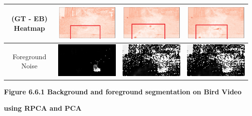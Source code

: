 \documentclass[11pt]{scrartcl} %
\theoremstyle{plain}
\begin{document}
\begin{minipage}{\linewidth}
\begin{tabular}{ | c | m{2.8cm} | m{2.8cm} | m{2.8cm} | }
	(GT - EB) Heatmap
	&
    \begin{minipage}{.3\textwidth}
      \includegraphics[width=\linewidth, width=25mm]{figures_video/crow/rpca/hm_0_015.png}
    \end{minipage}	
	&
    \begin{minipage}{.3\textwidth}
      \includegraphics[width=\linewidth, width=25mm]{figures_video/crow/pca/hm_0.png}
    \end{minipage}		
	&
    \begin{minipage}{.3\textwidth}
      \includegraphics[width=\linewidth, width=25mm]{figures_video/crow/pca2/hm_0.png}
    \end{minipage}		
	\\ \hline	
	
	Foreground Noise
	&
    \begin{minipage}{.3\textwidth}
      \includegraphics[width=\linewidth, width=25mm]{figures_video/crow/rpca/noise_0_015.png}
    \end{minipage}
	&
    \begin{minipage}{.3\textwidth}
      \includegraphics[width=\linewidth, width=25mm]{figures_video/crow/pca/noise_0.png}
    \end{minipage}
	&
    \begin{minipage}{.3\textwidth}
      \includegraphics[width=\linewidth, width=25mm]{figures_video/crow/pca2/noise_0.png}
    \end{minipage}
	\\ \hline	
	
  \end{tabular}

\bigskip
\centerline{\textbf{Figure 6.6.1 Background and foreground segmentation on Bird Video }}
\centerline{\textbf{using RPCA and PCA}}
\bigskip
\egroup
\end{minipage}
\end{document}
